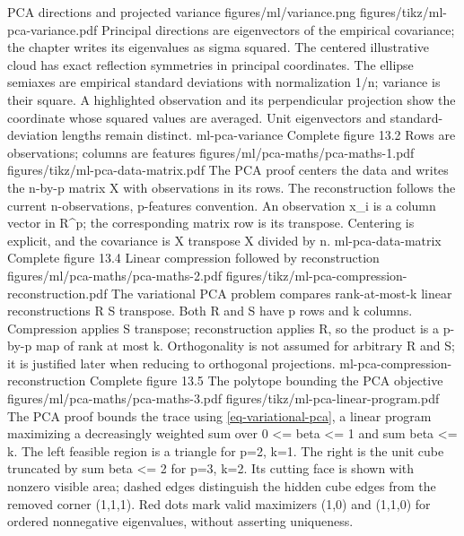 {PCA directions and projected variance}
{figures/ml/variance.png}
{figures/tikz/ml-pca-variance.pdf}
{Principal directions are eigenvectors of the empirical covariance; the chapter writes its eigenvalues as sigma squared.}
{The centered illustrative cloud has exact reflection symmetries in principal coordinates. The ellipse semiaxes are empirical standard deviations with normalization 1/n; variance is their square. A highlighted observation and its perpendicular projection show the coordinate whose squared values are averaged. Unit eigenvectors and standard-deviation lengths remain distinct.}
{ml-pca-variance}
{Complete figure}
{13.2}
{Rows are observations; columns are features}
{figures/ml/pca-maths/pca-maths-1.pdf}
{figures/tikz/ml-pca-data-matrix.pdf}
{The PCA proof centers the data and writes the n-by-p matrix X with observations in its rows.}
{The reconstruction follows the current n-observations, p-features convention. An observation x\_i is a column vector in R\textasciicircum{}p; the corresponding matrix row is its transpose. Centering is explicit, and the covariance is X transpose X divided by n.}
{ml-pca-data-matrix}
{Complete figure}
{13.4}
{Linear compression followed by reconstruction}
{figures/ml/pca-maths/pca-maths-2.pdf}
{figures/tikz/ml-pca-compression-reconstruction.pdf}
{The variational PCA problem compares rank-at-most-k linear reconstructions R S transpose.}
{Both R and S have p rows and k columns. Compression applies S transpose; reconstruction applies R, so the product is a p-by-p map of rank at most k. Orthogonality is not assumed for arbitrary R and S; it is justified later when reducing to orthogonal projections.}
{ml-pca-compression-reconstruction}
{Complete figure}
{13.5}
{The polytope bounding the PCA objective}
{figures/ml/pca-maths/pca-maths-3.pdf}
{figures/tikz/ml-pca-linear-program.pdf}
{The PCA proof bounds the trace using \eqref{eq-variational-pca}, a linear program maximizing a decreasingly weighted sum over 0 <= beta <= 1 and sum beta <= k.}
{The left feasible region is a triangle for p=2, k=1. The right is the unit cube truncated by sum beta <= 2 for p=3, k=2. Its cutting face is shown with nonzero visible area; dashed edges distinguish the hidden cube edges from the removed corner (1,1,1). Red dots mark valid maximizers (1,0) and (1,1,0) for ordered nonnegative eigenvalues, without asserting uniqueness.}
